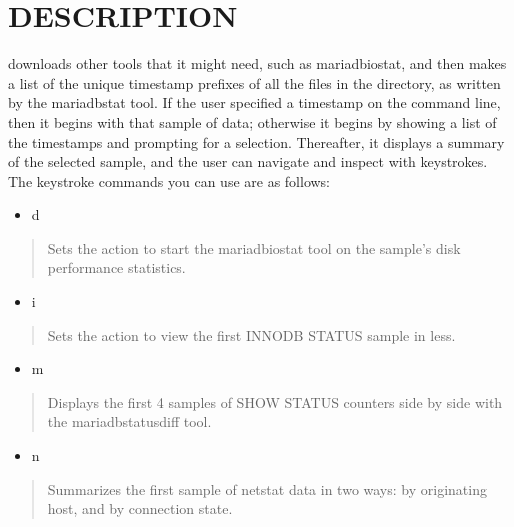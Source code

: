 \documentclass[letterpaper,10pt,english]{sphinxmanual}
\begin{document}
\section{DESCRIPTION}
\label{\detokenize{mariadb-stat-browser:description}}
\sphinxAtStartPar
{} downloads other tools that it might need, such as mariadb\sphinxhyphen{}iostat,
and then makes a list of the unique timestamp prefixes of all the files in
the directory, as written by the mariadb\sphinxhyphen{}stat tool.  If the user specified
a timestamp on the command line, then it begins with that sample of data;
otherwise it begins by showing a list of the timestamps and prompting for
a selection.  Thereafter, it displays a summary of the selected sample, and
the user can navigate and inspect with keystrokes.  The keystroke commands
you can use are as follows:
\begin{itemize}
\item {} 
\sphinxAtStartPar
d

\end{itemize}
\begin{quote}

\sphinxAtStartPar
Sets the action to start the mariadb\sphinxhyphen{}iostat tool on the sample’s disk
performance statistics.
\end{quote}
\begin{itemize}
\item {} 
\sphinxAtStartPar
i

\end{itemize}
\begin{quote}

\sphinxAtStartPar
Sets the action to view the first INNODB STATUS sample in less.
\end{quote}
\begin{itemize}
\item {} 
\sphinxAtStartPar
m

\end{itemize}
\begin{quote}

\sphinxAtStartPar
Displays the first 4 samples of SHOW STATUS counters side by side with the
mariadb\sphinxhyphen{}status\sphinxhyphen{}diff tool.
\end{quote}
\begin{itemize}
\item {} 
\sphinxAtStartPar
n

\end{itemize}
\begin{quote}

\sphinxAtStartPar
Summarizes the first sample of netstat data in two ways: by originating host,
and by connection state.
\end{quote}
\end{document}
